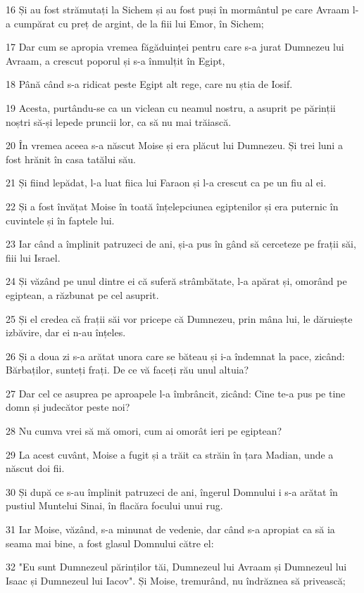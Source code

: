 \par 16 Și au fost strămutați la Sichem și au fost puși în mormântul pe care Avraam l-a cumpărat cu preț de argint, de la fiii lui Emor, în Sichem;
\par 17 Dar cum se apropia vremea făgăduinței pentru care s-a jurat Dumnezeu lui Avraam, a crescut poporul și s-a înmulțit în Egipt,
\par 18 Până când s-a ridicat peste Egipt alt rege, care nu știa de Iosif.
\par 19 Acesta, purtându-se ca un viclean cu neamul nostru, a asuprit pe părinții noștri să-și lepede pruncii lor, ca să nu mai trăiască.
\par 20 În vremea aceea s-a născut Moise și era plăcut lui Dumnezeu. Și trei luni a fost hrănit în casa tatălui său.
\par 21 Și fiind lepădat, l-a luat fiica lui Faraon și l-a crescut ca pe un fiu al ei.
\par 22 Și a fost învățat Moise în toată înțelepciunea egiptenilor și era puternic în cuvintele și în faptele lui.
\par 23 Iar când a împlinit patruzeci de ani, și-a pus în gând să cerceteze pe frații săi, fiii lui Israel.
\par 24 Și văzând pe unul dintre ei că suferă strâmbătate, l-a apărat și, omorând pe egiptean, a răzbunat pe cel asuprit.
\par 25 Și el credea că frații săi vor pricepe că Dumnezeu, prin mâna lui, le dăruiește izbăvire, dar ei n-au înțeles.
\par 26 Și a doua zi s-a arătat unora care se băteau și i-a îndemnat la pace, zicând: Bărbaților, sunteți frați. De ce vă faceți rău unul altuia?
\par 27 Dar cel ce asuprea pe aproapele l-a îmbrâncit, zicând: Cine te-a pus pe tine domn și judecător peste noi?
\par 28 Nu cumva vrei să mă omori, cum ai omorât ieri pe egiptean?
\par 29 La acest cuvânt, Moise a fugit și a trăit ca străin în țara Madian, unde a născut doi fii.
\par 30 Și după ce s-au împlinit patruzeci de ani, îngerul Domnului i s-a arătat în pustiul Muntelui Sinai, în flacăra focului unui rug.
\par 31 Iar Moise, văzând, s-a minunat de vedenie, dar când s-a apropiat ca să ia seama mai bine, a fost glasul Domnului către el:
\par 32 "Eu sunt Dumnezeul părinților tăi, Dumnezeul lui Avraam și Dumnezeul lui Isaac și Dumnezeul lui Iacov". Și Moise, tremurând, nu îndrăznea să privească;
